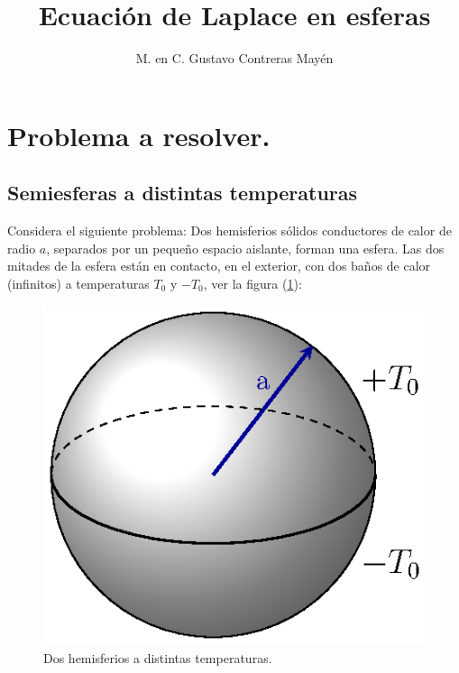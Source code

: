 
\title{Ecuación de Laplace en esferas} \vspace{-3ex}
\author{M. en C. Gustavo Contreras Mayén}
\date{ }
\newcommand{\Cancel}[2][black]{{\color{#1}\cancel{\color{black}#2}}}

\vspace{-4cm}
\maketitle
\fontsize{14}{14}\selectfont
\tableofcontents
\newpage

\section{Problema a resolver.}
\subsection{Semiesferas a distintas temperaturas}

Considera el siguiente problema: Dos hemisferios sólidos conductores de calor de radio $a$, separados por un pequeño espacio aislante, forman una esfera. Las dos mitades de la esfera están en contacto, en el exterior, con dos baños de calor (infinitos) a temperaturas $T_{0}$ y $-T_{0} $, ver la figura (\ref{fig:figura_esfera_01}):
\begin{figure}[H]
    \centering
    \includegraphics[scale=1.3]{Imagenes/Ejemplo_Esfera_01.eps}
    \caption{Dos hemisferios a distintas temperaturas.}
    \label{fig:figura_esfera_01}
\end{figure}

